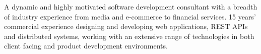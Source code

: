

\begin{cvparagraph}

A dynamic and highly motivated software development consultant with a breadth of industry experience from media and e-commerce to financial services. 15 years' commercial experience designing and developing web applications, REST APIs and distributed systems, working with an extensive range of technologies in both client facing and product development environments.
\end{cvparagraph}
